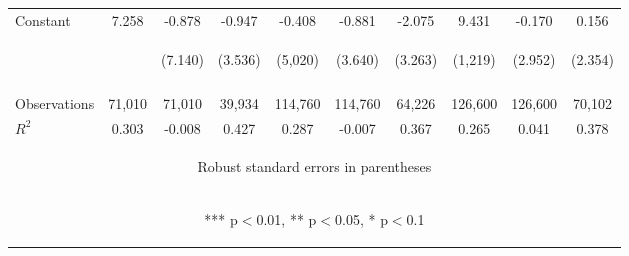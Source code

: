 \documentclass[]{article}
\begin{document}
\begin{center}
\begin{tabular}{lccccccccc}
Constant & 7.258 & -0.878 & -0.947 & -0.408 & -0.881 & -2.075 & 9.431 & -0.170 & 0.156 \\
 & \begin{footnotesize}\end{footnotesize} & \begin{footnotesize}(7.140)\end{footnotesize} & \begin{footnotesize}(3.536)\end{footnotesize} & \begin{footnotesize}(5,020)\end{footnotesize} & \begin{footnotesize}(3.640)\end{footnotesize} & \begin{footnotesize}(3.263)\end{footnotesize} & \begin{footnotesize}(1,219)\end{footnotesize} & \begin{footnotesize}(2.952)\end{footnotesize} & \begin{footnotesize}(2.354)\end{footnotesize} \\
\vspace{4pt} & \begin{footnotesize}\end{footnotesize} & \begin{footnotesize}\end{footnotesize} & \begin{footnotesize}\end{footnotesize} & \begin{footnotesize}\end{footnotesize} & \begin{footnotesize}\end{footnotesize} & \begin{footnotesize}\end{footnotesize} & \begin{footnotesize}\end{footnotesize} & \begin{footnotesize}\end{footnotesize} & \begin{footnotesize}\end{footnotesize} \\
Observations & 71,010 & 71,010 & 39,934 & 114,760 & 114,760 & 64,226 & 126,600 & 126,600 & 70,102 \\
 $R^2$ & 0.303 & -0.008 & 0.427 & 0.287 & -0.007 & 0.367 & 0.265 & 0.041 & 0.378 \\ \hline
\multicolumn{10}{c}{\begin{footnotesize} Robust standard errors in parentheses\end{footnotesize}} \\
\multicolumn{10}{c}{\begin{footnotesize} *** p$<$0.01, ** p$<$0.05, * p$<$0.1\end{footnotesize}} \\
\end{tabular}
\end{center}
\end{document}
